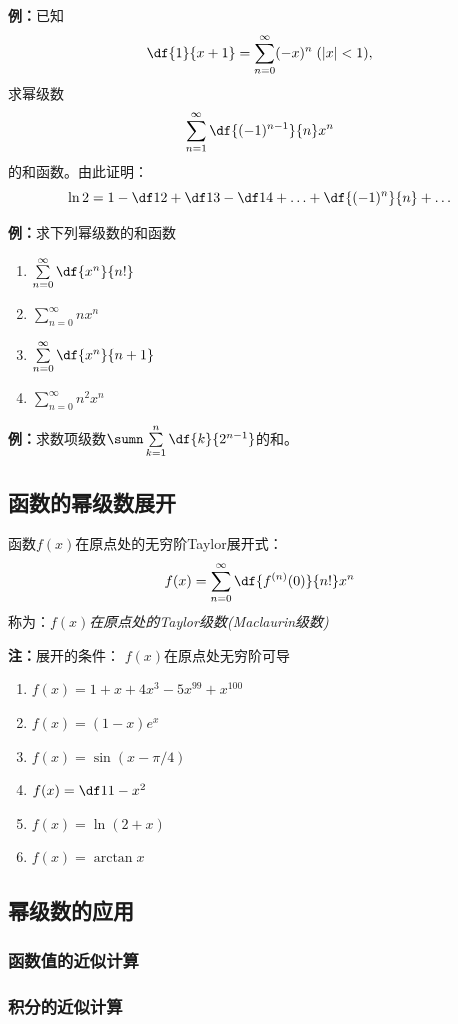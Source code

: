 {\bf 例：}已知
$$\df{1}{x+1}=\sum\limits_{n=0}^{\infty}(-x)^n\;(|x|<1),$$
求幂级数
$$\sum\limits_{n=1}^{\infty}\df{(-1)^{n-1}}{n}x^n$$
的和函数。由此证明：
$$\ln 2=1-\df 12+\df 13-\df 14+\ldots+\df{(-1)^n}{n}+\ldots$$

{\bf 例：}求下列幂级数的和函数
\begin{enumerate}[(1)]
  \setlength{\itemindent}{1cm}
  \item $\sum\limits_{n=0}^{\infty}\df{x^n}{n!}$
  \item $\sum\limits_{n=0}^{\infty}nx^n$
  \item $\sum\limits_{n=0}^{\infty}\df{x^n}{n+1}$
  \item $\sum\limits_{n=0}^{\infty}n^2x^n$
\end{enumerate}

{\bf 例：}求数项级数$\sumn\sum\limits_{k=1}^n\df{k}{2^{n-1}}$的和。

\subsection{函数的幂级数展开}

函数$f(x)$在原点处的无穷阶Taylor展开式： 
$$f(x)=\sum\limits_{n=0}^{\infty}\df{f^{(n)}(0)}{n!}x^n$$
 称为：{\it $f(x)$在原点处的Taylor级数(Maclaurin级数)} 
 
{\bf 注：}展开的条件： $f(x)$在原点处无穷阶可导

\begin{enumerate}[(1)]
  \setlength{\itemindent}{1cm}
  \item $f(x)=1+x+4x^3-5x^{99}+x^{100}$ 
  \item $f(x)=(1-x)e^x$ 
  \item $f(x)=\sin(x-\pi/4)$ 
  \item $f(x)=\df 1{1-x^2}$ 
  \item $f(x)=\ln(2+x)$ 
  \item $f(x)=\arctan x$
\end{enumerate}

\subsection{幂级数的应用}

\subsubsection{函数值的近似计算}

\subsubsection{积分的近似计算}

